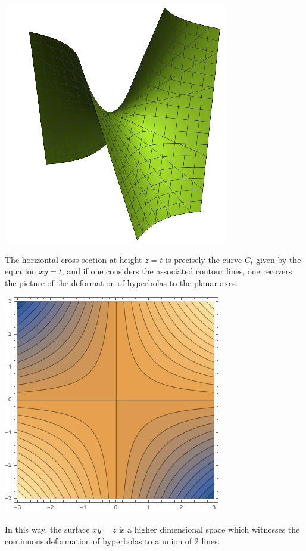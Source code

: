 \documentclass[12 pt]{article}
\begin{document}
\begin{center}
    \includegraphics[width=.3\paperwidth]{images/xyz.png}
\end{center}
The horizontal cross section at height $z = t$ is precisely the curve $C_t$ given by the equation $xy=t$, and if one considers the associated contour lines, one recovers the picture of the deformation of hyperbolas to the planar axes.
\begin{center}
    \includegraphics[width=.4\paperwidth]{images/xyzTop.png}
\end{center}
In this way, the surface $xy=z$ is a higher dimensional space which witnesses the continuous deformation of hyperbolas to a union of 2 lines.\\
\end{document}
